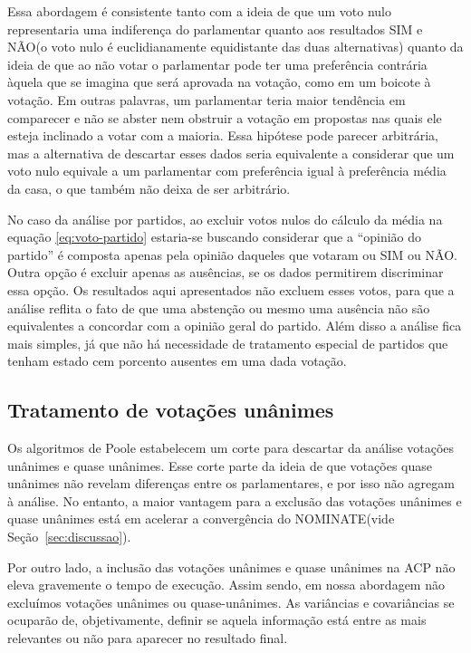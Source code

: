 \documentclass[
	article,			%
	12pt,				%
    twoside,			%
	a4paper,			%
	english,			%
	french,				%
	spanish,			%
	brazil,				%
	]{abntex2}
\newcommand\nay{NÃO\xspace}
\newcommand\yea{SIM\xspace}
\newcommand\nominate{NOMINATE\xspace}
\begin{document}
Essa abordagem é consistente tanto com a ideia de que um voto nulo representaria uma indiferença do parlamentar quanto aos resultados \yea e \nay (o voto nulo é euclidianamente equidistante das duas alternativas) quanto da ideia de que ao não votar o parlamentar pode ter uma preferência contrária àquela que se imagina que será aprovada na votação, como em um boicote à votação. Em outras palavras, um parlamentar teria maior tendência em comparecer e não se abster nem obstruir a votação em propostas nas quais ele esteja inclinado a votar com a maioria. Essa hipótese pode parecer arbitrária, mas a alternativa de descartar esses dados seria equivalente a considerar que um voto nulo equivale a um parlamentar com preferência igual à preferência média da casa, o que também não deixa de ser arbitrário.


No caso da análise por partidos, ao excluir votos nulos do cálculo da média na equação \ref{eq:voto-partido} estaria-se buscando considerar que a ``opinião do partido'' é composta apenas pela opinião daqueles que votaram ou \yea ou \nay. Outra opção é excluir apenas as ausências, se os dados permitirem discriminar essa opção. Os resultados aqui apresentados não excluem esses votos, para que a análise reflita o fato de que uma abstenção ou mesmo uma ausência não são equivalentes a concordar com a opinião geral do partido. Além disso a análise fica mais simples, já que não há necessidade de tratamento especial de partidos que tenham estado cem porcento ausentes em uma dada votação.

\subsection{Tratamento de votações unânimes}

Os algoritmos de Poole estabelecem um corte para descartar da análise votações unânimes e quase unânimes. Esse corte parte da ideia de que votações quase unânimes não revelam diferenças entre os parlamentares, e por isso não agregam à análise. No entanto, a maior vantagem para a exclusão das votações unânimes e quase unânimes está em acelerar a convergência do \nominate (vide Seção~\ref{sec:discussao}).

Por outro lado, a inclusão das votações unânimes e quase unânimes na ACP não eleva gravemente o tempo de execução. Assim sendo, em nossa abordagem não excluímos votações unânimes ou quase-unânimes. As variâncias e covariâncias se ocuparão de, objetivamente, definir se aquela informação está entre as mais relevantes ou não para aparecer no resultado final.
\end{document}
